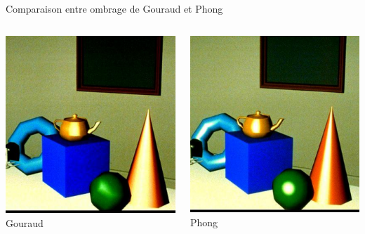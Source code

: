 \begin{frame}[t]{Comparaison entre ombrage de Gouraud et Phong}
  \begin{columns}
\begin{column}{.49\textwidth}
\includegraphics[width=\columnwidth]{figs/exgouraud.png} \\
Gouraud
\end{column}
\begin{column}{.49\textwidth}
\includegraphics[width=\columnwidth]{figs/exphong.png} \\
Phong
\end{column}
  \end{columns}
\end{frame}

